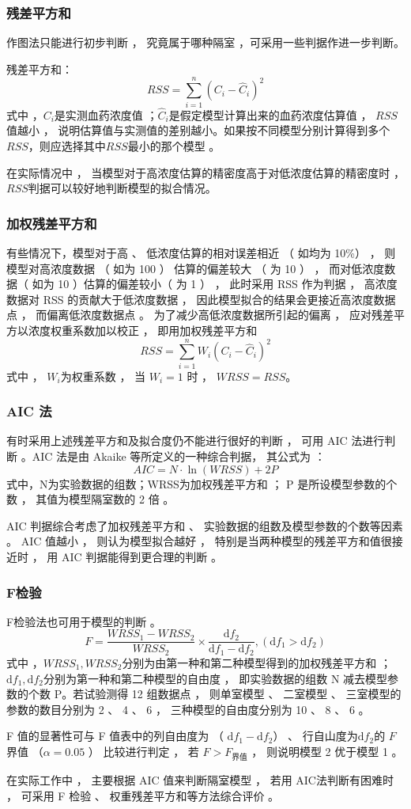 \documentclass[dvipsnames, svgnames, x11names]{beamer}
\begin{document}
\begin{frame}
    \frametitle{残差平方和}
    作图法只能进行初步判断 ， 究竟属于哪种隔室 ，可采用一些判据作进一步判断。

    残差平方和：
    \[
        RSS=\sum_{i=1}^{n}(C_{i}-\hat{C}_{i})^{2}
    \]
    式中 ，$C_{i}$是实测血药浓度值 ；$\hat{C}_{i}$是假定模型计算出来的血药浓度估算值 ， $RSS$值越小 ， 说明估算值与实测值的差别越小。如果按不同模型分别计算得到多个$RSS$，则应选择其中$RSS$最小的那个模型 。

    在实际情况中 ， 当模型对于高浓度估算的精密度高于对低浓度估算的精密度时 ， $RSS$判据可以较好地判断模型的拟合情况。
\end{frame}


\begin{frame}
    \frametitle{加权残差平方和}
    有些情况下，模型对于高 、 低浓度估算的相对误差相近 （ 如均为 10\%） ， 则模型对高浓度数据 （ 如为 100 ） 估算的偏差较大 （ 为 10 ） ， 而对低浓度数据（ 如为 10 ）估算的偏差较小（ 为 1 ） ， 此时采用 RSS 作为判据 ， 高浓度数据对 RSS 的贡献大于低浓度数据 ， 因此模型拟合的结果会更接近高浓度数据点 ， 而偏离低浓度数据点 。 为了减少高低浓度数据所引起的偏离 ， 应对残差平方以浓度权重系数加以校正 ， 即用加权残差平方和
    \[
        RSS=\sum_{i=1}^{n}W_i(C_{i}-\hat{C}_{i})^{2}
    \]
    式中 ， $W_i$为权重系数 ， 当 $W_i= 1$ 时 ， $WRSS=RSS$。
\end{frame}


\begin{frame}
    \frametitle{AIC 法}
    有时采用上述残差平方和及拟合度仍不能进行很好的判断 ， 可用 AIC 法进行判断 。AIC 法是由 Akaike 等所定义的一种综合判据， 其公式为 ：
    \[
        AIC=N\cdot\ln{(WRSS)}+2P
    \]
    式中，N为实验数据的组数；WRSS为加权残差平方和 ； P 是所设模型参数的个数 ， 其值为模型隔室数的 2 倍 。

    AIC 判据综合考虑了加权残差平方和 、 实验数据的组数及模型参数的个数等因素 。 AIC 值越小 ， 则认为模型拟合越好 ， 特别是当两种模型的残差平方和值很接近时 ， 用 AIC 判据能得到更合理的判断 。
\end{frame}


\begin{frame}
    \frametitle{F检验}
    F检验法也可用于模型的判断 。
    \[
        F=\frac{WRSS_{1}-WRSS_{2}}{WRSS_{2}}\times\frac{\mathrm{d}f_{2}}{\mathrm{d}f_{1}-\mathrm{d}f_{2}},(\mathrm{d}f_{1}>\mathrm{d}f_{2})
    \]
    式中 ，$WRSS_{1}, WRSS_{2}$分别为由第一种和第二种模型得到的加权残差平方和 ； $\mathrm{d}f_{1}, \mathrm{d}f_{2}$分别为第一种和第二种模型的自由度 ， 即实验数据的组数 N 减去模型参数的个数 P。若试验测得 12 组数据点 ， 则单室模型 、 二室模型 、 三室模型的参数的数目分别为 2 、 4 、 6 ， 三种模型的自由度分别为 10 、 8 、 6 。

    F 值的显著性可与 F 值表中的列自由度为 （ $\mathrm{d}f_{1}-\mathrm{d}f_{2}$） 、 行自山度为$\mathrm{d}f_{2}$的 $F$ 界值 （$\alpha = 0.05$ ） 比较进行判定 ， 若 $F>F_\text{界值}$ ， 则说明模型 2 优于模型 1 。

    在实际工作中 ， 主要根据 AIC 值来判断隔室模型 ， 若用 AIC法判断有困难时 ， 可采用 F 检验 、 权重残差平方和等方法综合评价 。
\end{frame}
\end{document}
